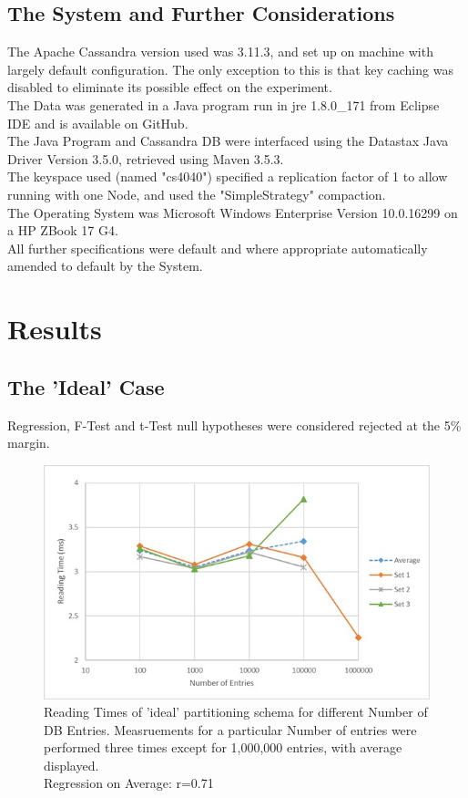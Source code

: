 \documentclass{template/csfourzero}
\begin{document}
  \subsection{The System and Further Considerations}
  The Apache Cassandra \cite{apacheCassandra} version used was 3.11.3, and set up on machine with largely default configuration. The only exception to this is that key caching was disabled to eliminate its possible effect on the experiment.
  \\
  The Data was generated in a Java program run in jre 1.8.0\_171 from Eclipse IDE and is available on GitHub. \cite{myGit}
  \\
  The Java Program and Cassandra DB were interfaced using the Datastax Java Driver Version 3.5.0, retrieved using Maven 3.5.3. \cite{gitDriver}
  \\
  The keyspace used (named "cs4040") specified a replication factor of 1 to allow running with one Node, and used the "SimpleStrategy" compaction.
  \\
  The Operating System was Microsoft Windows Enterprise Version 10.0.16299 on a HP ZBook 17 G4. \cite{workstation}
  \\
  All further specifications were default and where appropriate automatically amended to default by the System.


\section{Results} %
\label{sec:results}

  \subsection{The 'Ideal' Case}
  
  Regression, F-Test and t-Test null hypotheses were considered rejected at the 5\% margin.
  
  \begin{figure}[H]
      \centering
      \includegraphics{figures/idealTimes.jpg}
      \caption{Reading Times of 'ideal' partitioning schema for different Number of DB Entries. Measruements for a particular Number of entries were performed three times except for 1,000,000 entries, with average displayed.
      \\
      Regression on Average: r=0.71}
      \label{fig:idealTimes}
  \end{figure}
  
\end{document}

